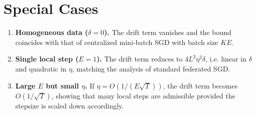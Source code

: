 \documentclass{article}
\begin{document}
\section*{Special Cases}
\begin{enumerate}
\item \textbf{Homogeneous data ($\delta=0$).}
The drift term vanishes and the bound coincides with that of centralized
mini‑batch SGD with batch size $K\!E$.
\item \textbf{Single local step ($E=1$).}
The drift term reduces to $4L^2\eta^2\delta$, i.e. linear in $\delta$ and
quadratic in $\eta$, matching the analysis of standard federated SGD.
\item \textbf{Large $E$ but small $\eta$.}
If $\eta = O(1/(E\sqrt{T}))$, the drift term becomes $O(1/\sqrt{T})$,
showing that many local steps are admissible provided the stepsize is
scaled down accordingly.
\end{enumerate}
\end{document}
